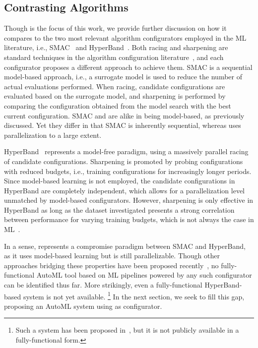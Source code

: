 \subsection{Contrasting Algorithms}
Though \irace is the focus of this work, we provide further discussion on how it compares to the two most relevant algorithm configurators employed in the ML literature, i.e., SMAC~\cite{smac} and HyperBand~\cite{li2017hyperband}. Both racing and sharpening are standard techniques in the algorithm configuration literature~\cite{BezLopStu2020}, and each configurator proposes a different approach to achieve them. SMAC is a sequential model-based approach, i.e., a surrogate model is used to reduce the number of actual evaluations performed. When racing, candidate configurations are evaluated based on the surrogate model, and sharpening is performed by comparing the configuration obtained from the model search with the best current configuration. SMAC and \irace are alike in being model-based, as previously discussed. Yet they differ in that SMAC is inherently sequential, whereas \irace uses parallelization to a large extent.

HyperBand~\cite{li2017hyperband} represents a model-free paradigm, using a massively parallel racing of candidate configurations. Sharpening is promoted by probing configurations with reduced budgets, i.e., training configurations for increasingly longer periods. Since model-based learning is not employed, the candidate configurations in HyperBand are completely independent, which allows for a parallelization level unmatched by model-based configurators. However, sharpening is only effective in HyperBand as long as the dataset investigated presents a strong correlation between performance for varying training budgets, which is not always the case in ML~\cite{ying2019nasbench}.

In a sense, \irace represents a compromise paradigm between SMAC and HyperBand, as it uses model-based learning but is still parallelizable. Though other approaches bridging these properties have been proposed recently~\cite{falkner2018bohb}, no fully-functional AutoML tool based on ML pipelines powered by any such configurator can be identified thus far. More strikingly, even a fully-functional HyperBand-based system is not yet available.%
\footnote{Such a system has been proposed in~\cite{autoband}, but it is not publicly available in a fully-functional form.}
In the next section, we seek to fill this gap, proposing an AutoML system using \irace as configurator.